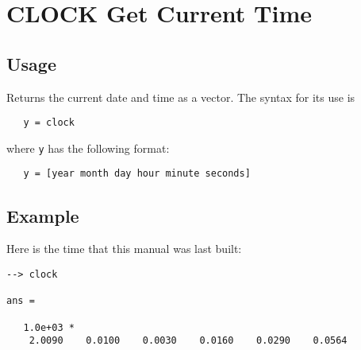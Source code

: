 \section{CLOCK Get Current Time}

\subsection{Usage}

Returns the current date and time as a vector.  The syntax for its use is
\begin{verbatim}
   y = clock
\end{verbatim}
where \verb|y| has the following format:
\begin{verbatim}
   y = [year month day hour minute seconds]
\end{verbatim}
\subsection{Example}

Here is the time that this manual was last built:
\begin{verbatim}
--> clock

ans = 

   1.0e+03 * 
    2.0090    0.0100    0.0030    0.0160    0.0290    0.0564 
\end{verbatim}
